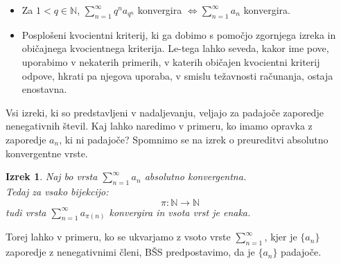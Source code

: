 \documentclass[a4paper,12pt]{article}
\def\N{\mathbb{N}} %
\newtheorem{izrek}{Izrek}
\begin{document}
\begin{itemize}
    \item Za $ 1 < q \in \N$, $\sum_{n = 1}^{\infty}{q^na_{q^n}}$ konvergira $\iff \sum_{n = 1}^{\infty}{a_{n}}$ konvergira.
    \item Posplošeni kvocientni kriterij, ki ga dobimo s pomočjo zgornjega izreka in običajnega kvocientnega kriterija.
    Le-tega lahko seveda, kakor ime pove, uporabimo v nekaterih primerih, v katerih običajen kvocientni kriterij odpove, 
    hkrati pa njegova uporaba, v smislu težavnosti računanja, ostaja enostavna.
\end{itemize}


Vsi izreki, ki so predstavljeni v nadaljevanju, veljajo za padajoče zaporedje nenegativnih števil.
Kaj lahko naredimo v primeru, ko imamo opravka z zaporedje $a_n$, ki ni padajoče?
Spomnimo se na izrek o preureditvi absolutno konvergentne vrste.

\begin{izrek}
    Naj bo vrsta $\sum_{n = 1}^{\infty}{a_n}$ absolutno konvergentna.\\
    Tedaj za vsako bijekcijo:
    \[\pi: \N \rightarrow \N \]
    tudi vrsta $\sum_{n = 1}^{\infty}{a_{\pi(n)}}$ konvergira in vsota vrst je enaka.
\end{izrek}

Torej lahko v primeru, ko se ukvarjamo z vsoto vrste $\sum_{n = 1}^{\infty}$, kjer je $\{a_n\}$ zaporedje z nenegativnimi členi, BŠS predpostavimo, 
da je $\{a_n\}$ padajoče. 



\begin{abstract}
\end{abstract}


\tableofcontents

\pagebreak










\end{document}
